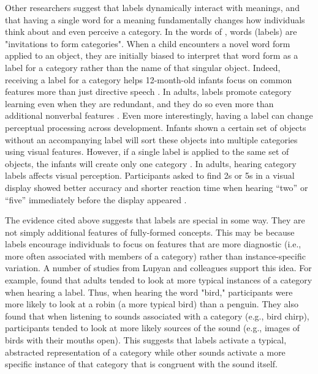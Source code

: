 \documentclass[../dissertation.tex]{subfiles}
\begin{document}
	Other researchers suggest that labels dynamically interact with meanings, and that having a single word for a meaning fundamentally changes how individuals think about and even perceive a category. In the words of \citet{Waxman1995}, words (labels) are "invitations to form categories". When a child encounters a novel word form applied to an object, they are initially biased to interpret that word form as a label for a category rather than the name of that singular object. Indeed, receiving a label for a category helps 12-month-old infants focus on common features more than just directive speech \citep{Althaus2014}. In adults, labels promote category learning even when they are redundant, and they do so even more than additional nonverbal features \citep{Lupyan2007}. Even more interestingly, having a label can change perceptual processing across development. Infants shown a certain set of objects without an accompanying label will sort these objects into multiple categories using visual features. However, if a single label is applied to the same set of objects, the infants will create only one category \citep{Plunkett2008}. In adults, hearing category labels affects visual perception. Participants asked to find 2s or 5s in a visual display showed better accuracy and shorter reaction time when hearing “two” or “five” immediately before the display appeared \citep{Lupyan2010}.  \par
	The evidence cited above suggests that labels are special in some way. They are not simply additional features of fully-formed concepts. This may be because labels encourage individuals to focus on features that are more diagnostic (i.e., more often associated with members of a category) rather than instance-specific variation. A number of studies from Lupyan and colleagues support this idea. For example, \citet{Edmiston2015} found that adults tended to look at more typical instances of a category when hearing a label. Thus, when hearing the word "bird," participants were more likely to look at a robin (a more typical bird) than a penguin. They also found that when listening to sounds associated with a category (e.g., bird chirp), participants tended to look at more likely sources of the sound (e.g., images of birds with their mouths open). This suggests that labels activate a typical, abstracted representation of a category while other sounds activate a more specific instance of that category that is congruent with the sound itself. \par
\end{document}

